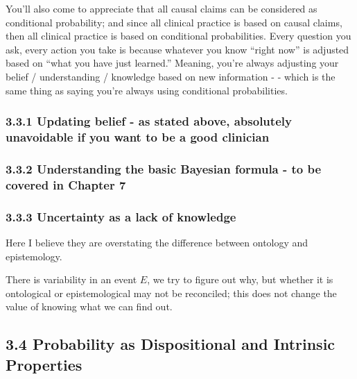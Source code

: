 \documentclass[
]{book}
\begin{document}
You'll also come to appreciate that all causal claims can be considered as conditional probability; and since all clinical practice is based on causal claims, then all clinical practice is based on conditional probabilities. Every question you ask, every action you take is because whatever you know ``right now'' is adjusted based on ``what you have just learned.'' Meaning, you're always adjusting your belief / understanding / knowledge based on new information - - which is the same thing as saying you're always using conditional probabilities.

\hypertarget{updating-belief---as-stated-above-absolutely-unavoidable-if-you-want-to-be-a-good-clinician}{%
\subsubsection{3.3.1 Updating belief - as stated above, absolutely unavoidable if you want to be a good clinician}\label{updating-belief---as-stated-above-absolutely-unavoidable-if-you-want-to-be-a-good-clinician}}

\hypertarget{understanding-the-basic-bayesian-formula---to-be-covered-in-chapter-7}{%
\subsubsection{3.3.2 Understanding the basic Bayesian formula - to be covered in Chapter 7}\label{understanding-the-basic-bayesian-formula---to-be-covered-in-chapter-7}}

\hypertarget{uncertainty-as-a-lack-of-knowledge}{%
\subsubsection{3.3.3 Uncertainty as a lack of knowledge}\label{uncertainty-as-a-lack-of-knowledge}}

Here I believe they are overstating the difference between ontology and epistemology.

There is variability in an event \(E\), we try to figure out why, but whether it is ontological or epistemological may not be reconciled; this does not change the value of knowing what we can find out.

\hypertarget{probability-as-dispositional-and-intrinsic-properties}{%
\subsection{3.4 Probability as Dispositional and Intrinsic Properties}\label{probability-as-dispositional-and-intrinsic-properties}}
\end{document}
